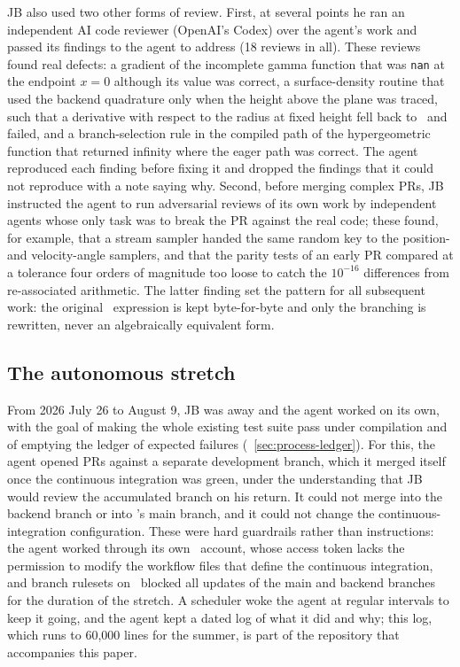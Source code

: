 JB also used two other forms of review. First, at several points he ran
an independent AI code reviewer (OpenAI's Codex) over the agent's work and
passed its findings to the agent to address (18 reviews in all). These
reviews found real defects: a gradient of the incomplete gamma function
that was \texttt{nan} at the endpoint $x=0$ although its value was
correct, a surface-density routine that used the backend quadrature
only when the height above the plane was traced, such that a derivative
with respect to the radius at fixed height fell back to \scipy\ and
failed, and a branch-selection rule in the compiled path of the
hypergeometric function that returned infinity where the eager path was
correct. The agent reproduced each finding before fixing it and dropped
the findings that it could not reproduce with a note saying why.
Second, before merging complex PRs, JB instructed the agent to run
adversarial reviews of its own work by independent agents whose only
task was to break the PR against the real code; these found, for
example, that a stream sampler handed the same random key to the
position- and velocity-angle samplers, and that the parity tests of an
early PR compared at a tolerance four orders of magnitude too loose to
catch the $10^{-16}$ differences from re-associated arithmetic. The
latter finding set the pattern for all subsequent work: the original
\numpy\ expression is kept byte-for-byte and only the branching is
rewritten, never an algebraically equivalent form.

\subsection{The autonomous stretch}\label{sec:process-autonomous}

From 2026 July 26 to August 9, JB was away and the agent worked on its
own, with the goal of making the whole existing test suite pass under
compilation and of emptying the ledger of expected failures
(\sectionname~\ref{sec:process-ledger}). For this, the agent opened PRs
against a separate development branch, which it merged itself once the
continuous integration was green, under the understanding that JB would
review the accumulated branch on his return. It could not merge into
the backend branch or into \galpy's main branch, and it could not
change the continuous-integration configuration. These were hard
guardrails rather than instructions: the agent worked through its own
\github\ account, whose access token lacks the permission to modify the
workflow files that define the continuous integration, and branch
rulesets on \github\ blocked all updates of the main and backend
branches for the duration of the stretch. A scheduler woke the agent at
regular intervals to keep it going, and the agent kept a dated log of
what it did and why; this log, which runs to 60,000 lines for the
summer, is part of the repository that accompanies this paper.


